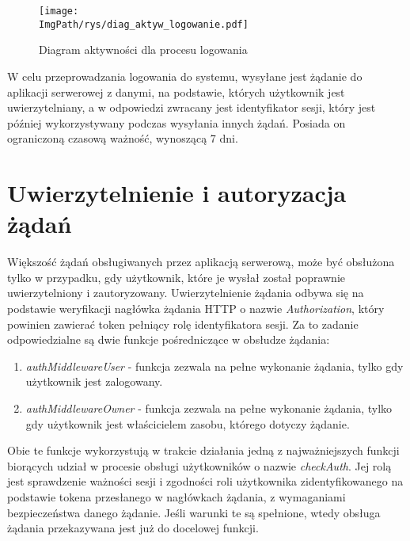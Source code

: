 \documentclass[a4paper,12pt,twoside,openany]{report}
\newcommand{\ImgPath}{.}
\begin{document}
\begin{figure}[!htbp]
	\begin{center}
		\centering
		\texttt{[image: \\ImgPath/rys/diag\_aktyw\_logowanie.pdf]}
	\end{center}
	\caption{Diagram aktywności dla procesu logowania}
	\label{diagramAktywnosciLogowanie}
\end{figure}
\newpage
W celu przeprowadzania logowania do systemu, wysyłane jest żądanie do aplikacji serwerowej z danymi, na podstawie, których użytkownik jest uwierzytelniany, a w odpowiedzi zwracany jest identyfikator sesji, który jest później wykorzystywany podczas wysyłania innych żądań. Posiada on ograniczoną czasową ważność, wynoszącą 7 dni.



\section{Uwierzytelnienie i autoryzacja żądań}
Większość żądań obsługiwanych przez aplikacją serwerową, może być obsłużona tylko w przypadku, gdy użytkownik, które je wysłał został poprawnie uwierzytelniony i zautoryzowany. 
Uwierzytelnienie żądania odbywa się na podstawie weryfikacji nagłówka żądania HTTP o nazwie \textit{Authorization}, który powinien zawierać token pełniący rolę identyfikatora sesji. Za to zadanie odpowiedzialne są dwie funkcje pośredniczące w obsłudze żądania: 
\begin{enumerate}
	
	\item \textit{authMiddlewareUser} - funkcja zezwala na pełne wykonanie żądania, tylko gdy użytkownik jest zalogowany.
	
	\item \textit{authMiddlewareOwner} - funkcja zezwala na pełne wykonanie żądania, tylko gdy użytkownik jest właścicielem zasobu, którego dotyczy żądanie.
	
\end{enumerate}

Obie te funkcje wykorzystują w trakcie działania jedną z najważniejszych funkcji biorących udział w procesie obsługi użytkowników o nazwie \textit{checkAuth}. Jej rolą jest sprawdzenie ważności sesji i zgodności roli użytkownika zidentyfikowanego na podstawie tokena przesłanego w nagłówkach żądania, z wymaganiami bezpieczeństwa danego żądanie. Jeśli warunki te są spełnione, wtedy obsługa żądania przekazywana jest już do docelowej funkcji. 
\end{document}
